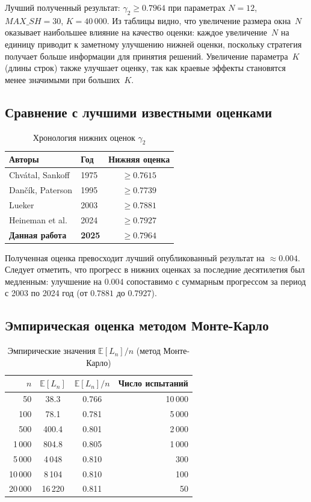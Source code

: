 \documentclass[12pt,a4paper]{article}
\begin{document}
Лучший полученный результат: $\gamma_2 \geq 0.7964$ при параметрах $N = 12$, $\mathit{MAX\_SH} = 30$, $K = 40\,000$.
Из таблицы видно, что увеличение размера окна~$N$ оказывает наибольшее влияние на качество оценки: каждое увеличение~$N$ на единицу приводит к заметному улучшению нижней оценки, поскольку стратегия получает больше информации для принятия решений.
Увеличение параметра~$K$ (длины строк) также улучшает оценку, так как краевые эффекты становятся менее значимыми при больших~$K$.

\subsection{Сравнение с лучшими известными оценками}

\begin{table}[h]
\centering
\caption{Хронология нижних оценок $\gamma_2$}
\label{tab:comparison}
\begin{tabular}{llc}
  \toprule
  \textbf{Авторы} & \textbf{Год} & \textbf{Нижняя оценка} \\
  \midrule
  Chv\'{a}tal, Sankoff & 1975 & $\geq 0.7615$ \\
  Dan\v{c}\'{i}k, Paterson & 1995 & $\geq 0.7739$ \\
  Lueker & 2003 & $\geq 0.7881$ \\
  Heineman et al. & 2024 & $\geq 0.7927$ \\
  \textbf{Данная работа} & \textbf{2025} & $\geq \mathbf{0.7964}$ \\
  \bottomrule
\end{tabular}
\end{table}

Полученная оценка превосходит лучший опубликованный результат на $\approx 0.004$.
Следует отметить, что прогресс в нижних оценках за последние десятилетия был медленным: улучшение на $0.004$ сопоставимо с суммарным прогрессом за период с 2003 по 2024 год (от $0.7881$ до $0.7927$).

\subsection{Эмпирическая оценка методом Монте-Карло}

\begin{table}[h]
\centering
\caption{Эмпирические значения $\mathbb{E}[L_n]/n$ (метод Монте-Карло)}
\label{tab:monte_carlo}
\begin{tabular}{rccr}
  \toprule
  $n$ & $\mathbb{E}[L_n]$ & $\mathbb{E}[L_n]/n$ & Число испытаний \\
  \midrule
  50 & 38.3 & 0.766 & 10\,000 \\
  100 & 78.1 & 0.781 & 5\,000 \\
  500 & 400.4 & 0.801 & 2\,000 \\
  1\,000 & 804.8 & 0.805 & 1\,000 \\
  5\,000 & 4\,048 & 0.810 & 300 \\
  10\,000 & 8\,104 & 0.810 & 100 \\
  20\,000 & 16\,220 & 0.811 & 50 \\
  \bottomrule
\end{tabular}
\end{table}
\end{document}
